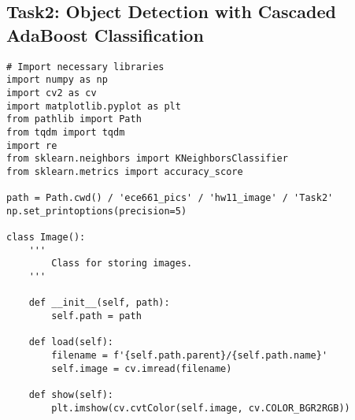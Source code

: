 \documentclass[11pt]{article}
\begin{document}
\newpage
\subsection*{Task2: Object Detection with Cascaded AdaBoost Classification}
\begin{lstlisting}
# Import necessary libraries
import numpy as np
import cv2 as cv
import matplotlib.pyplot as plt
from pathlib import Path
from tqdm import tqdm
import re
from sklearn.neighbors import KNeighborsClassifier
from sklearn.metrics import accuracy_score

path = Path.cwd() / 'ece661_pics' / 'hw11_image' / 'Task2'
np.set_printoptions(precision=5)

class Image():
    ''' 
        Class for storing images.
    '''
    
    def __init__(self, path):
        self.path = path   

    def load(self):
        filename = f'{self.path.parent}/{self.path.name}'
        self.image = cv.imread(filename)

    def show(self):
        plt.imshow(cv.cvtColor(self.image, cv.COLOR_BGR2RGB))
    

\end{lstlisting}
\end{document}
